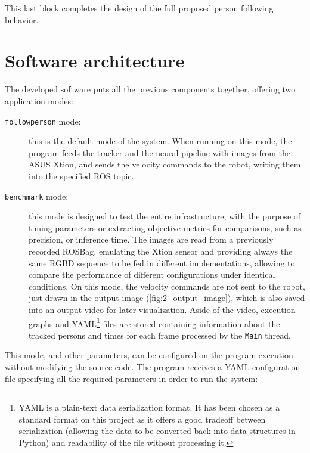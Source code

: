 This last block completes the design of the full proposed person following behavior.

\section{Software architecture}
\label{sec:3_swarch}
The developed software puts all the previous components together, offering two application modes:
\begin{description}
	\item[\texttt{followperson} mode:] this is the default mode of the system. When running on this mode, the program feeds the tracker and the neural pipeline with images from the ASUS Xtion, and sends the velocity commands to the robot, writing them into the specified ROS topic.
	
	\item[\texttt{benchmark} mode:] this mode is designed to test the entire infrastructure, with the purpose of tuning parameters or extracting objective metrics for comparisons, such as precision, or inference time. The images are read from a previously recorded ROSBag, emulating the Xtion sensor and providing always the same RGBD sequence to be fed in different implementations, allowing to compare the performance of different configurations under identical conditions. On this mode, the velocity commands are not sent to the robot, just drawn in the output image (\autoref{fig:2_output_image}), which is also saved into an output video for later visualization. Aside of the video, execution graphs and YAML\footnote{YAML is a plain-text data serialization format. It has been chosen as a standard format on this project as it offers a good tradeoff between serialization (allowing the data to be converted back into data structures in Python) and  readability of the file without processing it.} files are stored containing information about the tracked persons and times for each frame processed by the \texttt{Main} thread.
\end{description}

This mode, and other parameters, can be configured on the program execution without modifying the source code. The program receives a YAML configuration file specifying all the required parameters in order to run the system:

